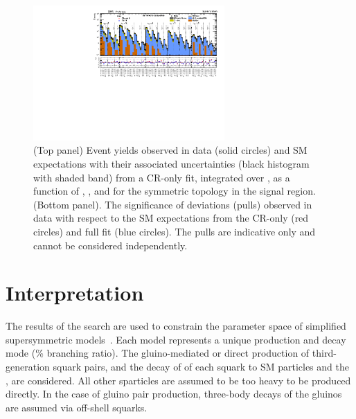 \begin{figure}[!tb]
  \begin{center}
    \includegraphics[angle=90,width=0.65\textwidth]{summaryPlot_Symmetric_prefit_overlay_fit_b}
    \caption{(Top panel) Event yields observed in data (solid circles)
      and SM expectations with their associated uncertainties (black
      histogram with shaded band) from a CR-only fit, integrated over
      \mht, as a function of \njet, \nb, and \scalht for the
      symmetric topology in the signal region. (Bottom panel). The
      significance of deviations (pulls) observed in data with respect
      to the SM expectations from the CR-only (red circles) and full
      fit (blue circles). The pulls are indicative only and cannot be
      considered independently.}
    \label{fig:sym}
  \end{center}
\end{figure}


\section{Interpretation}
\label{sec:interpretation}

The results of the search are used to constrain the parameter space of
simplified supersymmetric models~\cite{Alwall:2008ag, Alwall:2008va,
  sms}. Each model represents a unique production and decay mode (\% branching ratio). The gluino-mediated or direct production of
third-generation squark pairs, and the decay of of each squark to SM
particles and the \chiz, are considered. All other sparticles are
assumed to be too heavy to be produced directly. In the case of gluino
pair production, three-body decays of the gluinos are assumed via
off-shell squarks.

